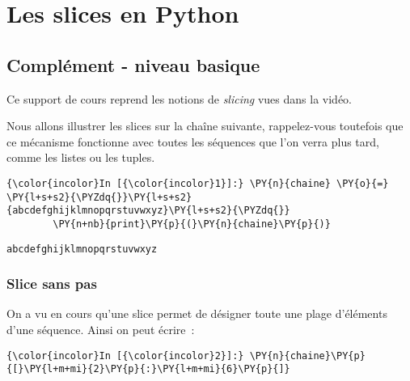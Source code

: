     
    
    
    

    

    \hypertarget{les-slices-en-python}{%
\section{Les slices en Python}\label{les-slices-en-python}}

    \hypertarget{compluxe9ment---niveau-basique}{%
\subsection{Complément - niveau
basique}\label{compluxe9ment---niveau-basique}}

    Ce support de cours reprend les notions de \emph{slicing} vues dans la
vidéo.

    Nous allons illustrer les slices sur la chaîne suivante, rappelez-vous
toutefois que ce mécanisme fonctionne avec toutes les séquences que l'on
verra plus tard, comme les listes ou les tuples.

    \begin{Verbatim}[commandchars=\\\{\},frame=single,framerule=0.3mm,rulecolor=\color{cellframecolor}]
{\color{incolor}In [{\color{incolor}1}]:} \PY{n}{chaine} \PY{o}{=} \PY{l+s+s2}{\PYZdq{}}\PY{l+s+s2}{abcdefghijklmnopqrstuvwxyz}\PY{l+s+s2}{\PYZdq{}}
        \PY{n+nb}{print}\PY{p}{(}\PY{n}{chaine}\PY{p}{)}
\end{Verbatim}


    \begin{Verbatim}[commandchars=\\\{\},frame=single,framerule=0.3mm,rulecolor=\color{cellframecolor}]
abcdefghijklmnopqrstuvwxyz
\end{Verbatim}

    \hypertarget{slice-sans-pas}{%
\subsubsection{Slice sans pas}\label{slice-sans-pas}}

    On a vu en cours qu'une slice permet de désigner toute une plage
d'éléments d'une séquence. Ainsi on peut écrire~:

    \begin{Verbatim}[commandchars=\\\{\},frame=single,framerule=0.3mm,rulecolor=\color{cellframecolor}]
{\color{incolor}In [{\color{incolor}2}]:} \PY{n}{chaine}\PY{p}{[}\PY{l+m+mi}{2}\PY{p}{:}\PY{l+m+mi}{6}\PY{p}{]}
\end{Verbatim}


